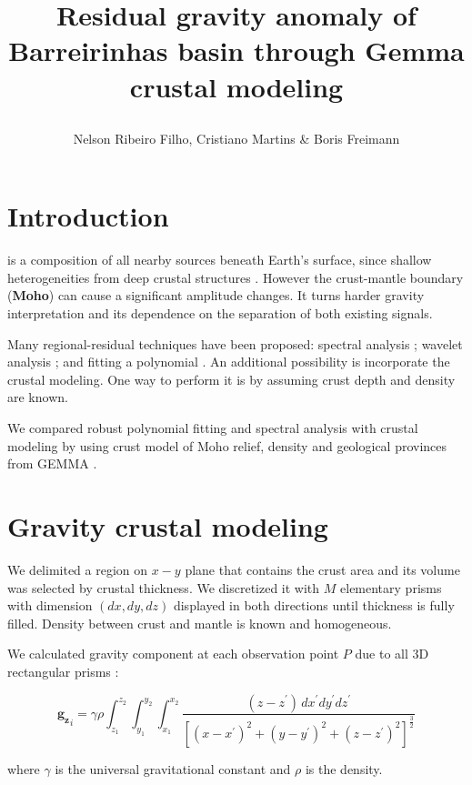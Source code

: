 \documentclass{sciposter}
\title{\begin{Huge}
		Residual gravity anomaly of Barreirinhas basin through Gemma crustal modeling
	\end{Huge}}
\author{Nelson Ribeiro Filho, Cristiano Martins \& Boris Freimann}
\institute 
{Observatório Nacional (ON/MCTI) \& 
	Universidade Federal do Pará (UFPA)}
\begin{document}
	
	
	\maketitle

	\begin{multicols}{3}

	\section*{\large Introduction}
	 is a composition of all nearby sources beneath Earth's surface, since shallow heterogeneities from deep crustal structures \cite{blakely1996potential}. However the crust-mantle boundary (\textbf{Moho}) can cause a significant amplitude changes. It turns harder gravity interpretation and its dependence on the separation of both existing signals.
		
	Many regional-residual techniques have been proposed: spectral analysis \cite{spector1970statistical}; wavelet analysis \cite{fedi1998wavelet}; and fitting a polynomial \cite{beltrao1991robust}. An additional possibility is incorporate the crustal modeling. One way to perform it is by assuming crust depth and density are known. 
		
	We compared robust polynomial fitting and spectral analysis with crustal modeling by using crust model of Moho relief, density and geological provinces from GEMMA \cite{sampietro2013gemma}.
		
	\section*{\large Gravity crustal modeling}
	We delimited a region on $x-y$ plane that contains the crust area and its volume was selected by crustal thickness. We discretized it with $M$ elementary prisms with dimension $(dx, dy, dz)$ displayed in both directions until thickness is fully filled. Density between crust and mantle is known and homogeneous.
	
	We calculated gravity component at each observation point $P$ due to all 3D rectangular prisms \cite{blakely1996potential}:
	\begin{small}
		$$
		\mathbf{g_z}_i = \gamma \rho \int_{z_1}^{z_2} \int_{y_1}^{y_2} \int_{x_1}^{x_2}
		\dfrac{(z - z^{'}) \, dx^{'}dy^{'}dz^{'}}
		{\left[(x - x^{'})^2 + 
		(y - y^{'})^2 + 
		(z - z^{'})^2\right]^{\frac{3}{2}}}
		$$
	\end{small}
	where $\gamma$ is the universal gravitational constant and $\rho$ is the density.
	

\end{multicols}
\end{document}
